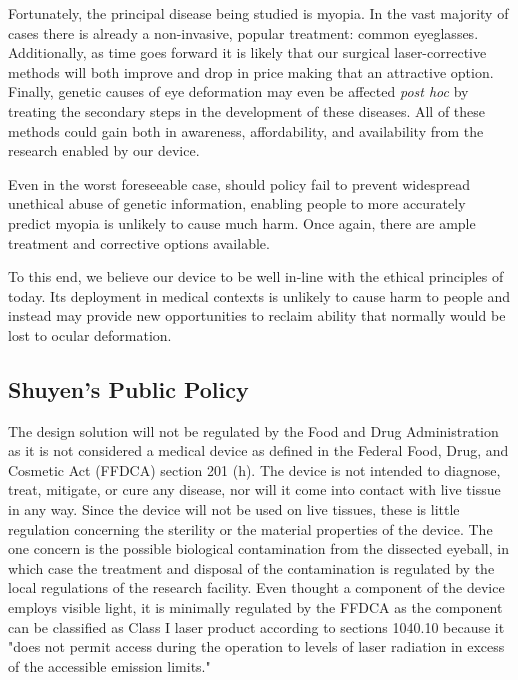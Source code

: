 \documentclass{article}
\begin{document}
Fortunately, the principal disease being studied is myopia. In the
vast majority of cases there is already a non-invasive, popular
treatment: common eyeglasses. Additionally, as time goes forward it is
likely that our surgical laser-corrective methods will both improve
and drop in price making that an attractive option. Finally, genetic
causes of eye deformation may even be affected \textit{post hoc} by
treating the secondary steps in the development of these diseases. All
of these methods could gain both in awareness, affordability, and
availability from the research enabled by our device.

Even in the worst foreseeable case, should policy fail to prevent
widespread unethical abuse of genetic information, enabling people to
more accurately predict myopia is unlikely to cause much harm. Once
again, there are ample treatment and corrective options available.

To this end, we believe our device to be well in-line with the ethical
principles of today. Its deployment in medical contexts is unlikely
to cause harm to people and instead may provide new opportunities to
reclaim ability that normally would be lost to ocular deformation.


	
\subsection{Shuyen's Public Policy}
\label{sec:Public Policy}

The design solution will not be regulated by the Food and Drug Administration as it is
not considered a medical device as defined in the Federal Food, Drug,
and Cosmetic Act (FFDCA) section 201 (h). The device is not intended
to diagnose, treat, mitigate, or cure any disease, nor will it come into
contact with live tissue in any way. Since the device will not be used
on live tissues, these is little regulation concerning the sterility
or the material properties of the device. The one concern is the
possible biological contamination from the dissected eyeball, in which
case the treatment and disposal of the contamination is regulated by
the local regulations of the research facility.  Even thought a
component of the device employs visible light, it is minimally
regulated by the FFDCA as the component can be classified as Class I
laser product according to sections 1040.10 because it "does not
permit access during the operation to levels of laser radiation in
excess of the accessible emission limits."




\newpage
{}


\end{document}
